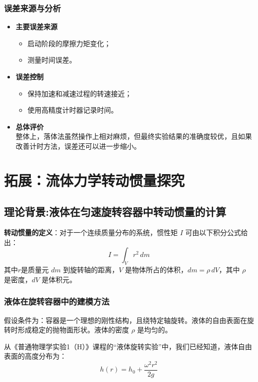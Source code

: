 \documentclass[12pt,hyperref,a4paper,UTF8]{ctexart}
\begin{document}
\subsubsection{误差来源与分析}
    \begin{itemize}
        \item \textbf{主要误差来源}
        \begin{itemize}
            \item 启动阶段的摩擦力矩变化；\cite{2}
            \item 测量时间误差。
        \end{itemize}
        \item \textbf{误差控制}
        \begin{itemize}
            \item 保持加速和减速过程的转速接近；\cite{3}
            \item 使用高精度计时器记录时间。
        \end{itemize}
        \item \textbf{总体评价} \\
            整体上，落体法虽然操作上相对麻烦，但最终实验结果的准确度较优，且如果改善计时方法，误差还可以进一步缩小。
    \end{itemize}

\section{拓展：流体力学转动惯量探究}
        \subsection{理论背景:液体在匀速旋转容器中转动惯量的计算}
        \textbf{转动惯量的定义}：对于一个连续质量分布的系统，惯性矩 $I$ 可由以下积分公式给出：  
        $$
        I = \int_V r^2 \,dm
        $$  
        其中$r$是质量元 $dm$ 到旋转轴的距离，$V$ 是物体所占的体积，$dm = \rho \, dV$，其中 $\rho$ 是密度，$dV$ 是体积元。
        
        \subsubsection{液体在旋转容器中的建模方法}
        
        假设条件为：容器是一个理想的刚性结构，且绕特定轴旋转。液体的自由表面在旋转时形成稳定的抛物面形状。液体的密度 $\rho$ 是均匀的。
        
        从《普通物理学实验1（H）》课程的“液体旋转实验”中，我们已经知道，液体自由表面的高度分布为： 
        $$
        h(r) = h_0 + \frac{\omega^2 r^2}{2g}
        $$  
        
\end{document}
